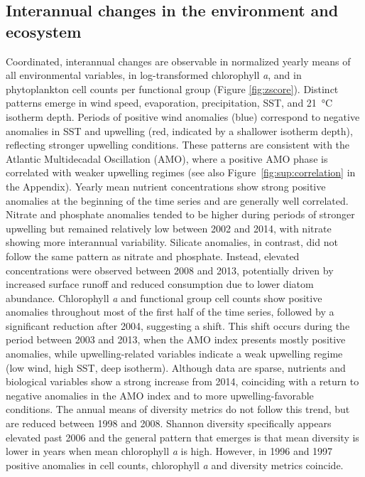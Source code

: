 \documentclass[draft]{agujournal2019}
\begin{document}
\subsection{Interannual changes in the environment and ecosystem}
    Coordinated, interannual changes are observable in normalized yearly means of all environmental variables, in log-transformed chlorophyll \textit{a}, and in phytoplankton cell counts per functional group (Figure \ref{fig:zscore}). Distinct patterns emerge in wind speed, evaporation, precipitation, SST, and \qty{21}{\celsius} isotherm depth. Periods of positive wind anomalies (blue) correspond to negative anomalies in SST and upwelling (red, indicated by a shallower isotherm depth), reflecting stronger upwelling conditions. These patterns are consistent with the Atlantic Multidecadal Oscillation (AMO), where a positive AMO phase is correlated with weaker upwelling regimes (see also Figure~\ref{fig:sup:correlation} in the Appendix). Yearly mean nutrient concentrations show strong positive anomalies at the beginning of the time series and are generally well correlated. Nitrate and phosphate anomalies tended to be higher during periods of stronger upwelling but remained relatively low between 2002 and 2014, with nitrate showing more interannual variability. Silicate anomalies, in contrast, did not follow the same pattern as nitrate and phosphate. Instead, elevated concentrations were observed between 2008 and 2013, potentially driven by increased surface runoff \cite{lorenzoni_characterization_2015} and reduced consumption due to lower diatom abundance.
    Chlorophyll \textit{a} and functional group cell counts show positive anomalies throughout most of the first half of the time series, followed by a significant reduction after 2004, suggesting a shift. This shift occurs during the period between 2003 and 2013, when the AMO index presents mostly positive anomalies, while upwelling-related variables indicate a weak upwelling regime (low wind, high SST, deep isotherm). Although data are sparse, nutrients and biological variables show a strong increase from 2014, coinciding with a return to negative anomalies in the AMO index and to more upwelling-favorable conditions.
    The annual means of diversity metrics do not follow this trend, but are reduced between 1998 and 2008. Shannon diversity specifically appears elevated past 2006 and the general pattern that emerges is that mean diversity is lower in years when mean chlorophyll \textit{a} is high. However, in 1996 and 1997 positive anomalies in cell counts, chlorophyll \textit{a} and diversity metrics coincide.
    
\end{document}
